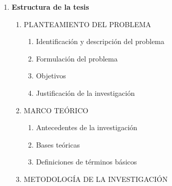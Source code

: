 \documentclass[12pt,a4paper]{article}
\begin{document}
\begin{enumerate}
	\item \textbf{Estructura de la tesis \flushbottom }
	\begin{enumerate}
		\item PLANTEAMIENTO DEL PROBLEMA 
		\begin{enumerate}
			\item Identificación y descripción del problema 
			\item Formulación del problema 
			\item Objetivos
			\item Justificación de la investigación 
		\end{enumerate}
		\item MARCO TEÓRICO 
		\begin{enumerate}
			\item Antecedentes de la investigación 
			\item Bases teóricas 
			\item Definiciones de términos básicos 
		\end{enumerate}
		\item METODOLOGÍA DE LA INVESTIGACIÓN 
		\begin{enumerate}

\end{enumerate}
\end{enumerate}
\end{enumerate}
\end{document}
